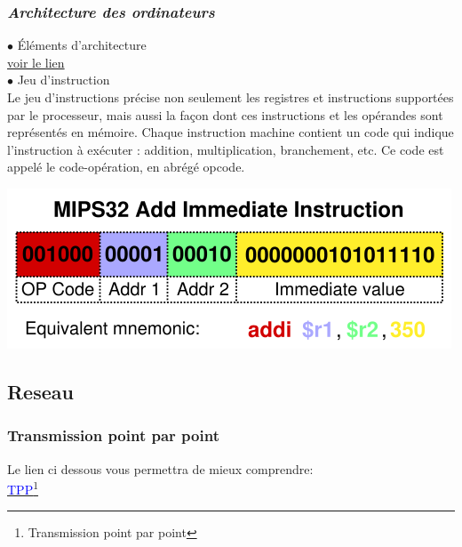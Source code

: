\documentclass[a4paper, 12pt]{article}
\begin{document}
\subsubsection{\textit{Architecture des ordinateurs}}
$\bullet$  Éléments d’architecture\\
\href{http://web.isen-bretagne.fr/livres/python/ressources/WEB/00-Chapitres/Chap1-Architecture.pdf}{voir le lien}\\
$\bullet$  Jeu d’instruction\\
Le jeu d'instructions précise non seulement les registres et instructions supportées par le processeur, mais aussi la façon dont ces instructions et les opérandes sont représentés en mémoire.
Chaque instruction machine contient un code qui indique l'instruction à exécuter : addition, multiplication, branchement, etc. Ce code est appelé le code-opération, en abrégé opcode. 
\begin{center}
\includegraphics[scale=0.3]{MIPS32_instruction.png}
\end{center}
\subsection{\textbf{Reseau}}

\subsubsection{Transmission point par point}
Le lien ci dessous vous permettra de mieux comprendre:\\
\href{http://www.youtube.com/watch?v=NCpIVzG-ejc}{\textcolor{blue}{TPP}}\footnote{Transmission point par point}
\end{document}
